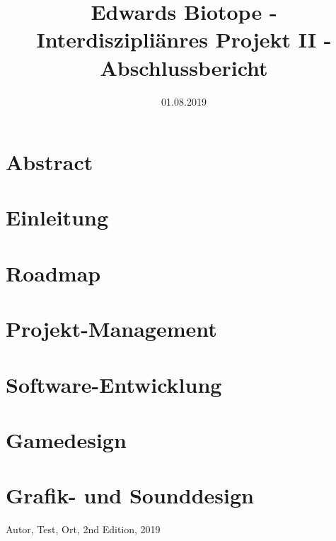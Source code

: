 \documentclass[12pt ,letterpaper]{article}
\title{Edwards Biotope - Interdiszipliänres Projekt II - Abschlussbericht}
\date{01.08.2019}
\begin{document}
\maketitle
\tableofcontents
\pagebreak
\section{Abstract}
\section{Einleitung}
\pagebreak
\section{Roadmap}

\pagebreak
\section{Projekt-Management}
\section{Software-Entwicklung}



\section{Gamedesign}

\section{Grafik- und Sounddesign} 
\pagebreak

\pagebreak
\begin{thebibliography}{9}
Autor, Test,
Ort,
2nd Edition,
2019
\end{thebibliography}
\listoffigures
\end{document}
